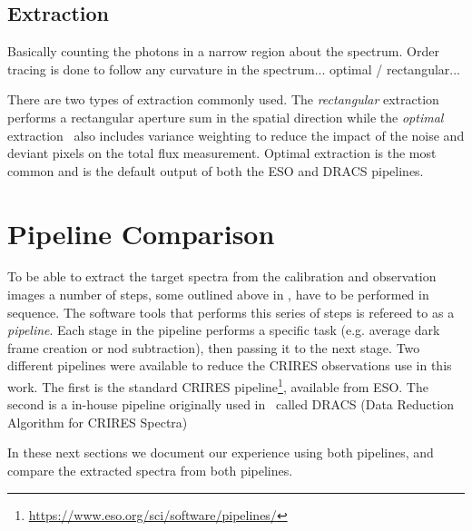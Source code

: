 
\subsection{Extraction}
Basically counting the photons in a narrow region about the spectrum. Order tracing is done to follow any curvature in the spectrum...
optimal / rectangular...

There are two types of extraction commonly used. The \emph{rectangular} extraction performs a rectangular aperture sum in the spatial direction while the \emph{optimal} extraction~\citep{horne_optimal_1986} also includes variance weighting to reduce the impact of the noise and deviant pixels on the total flux measurement. Optimal extraction is the most common and is the default output of both the ESO and DRACS pipelines.


\section{Pipeline Comparison}
To be able to extract the target spectra from the calibration and observation images a number of steps, some outlined above in , have to be performed in sequence. The software tools that performs this series of steps is refereed to as a \emph{pipeline}. Each stage in the pipeline performs a specific task (e.g. average dark frame creation or nod subtraction), then passing it to the next stage. Two different pipelines were available to reduce the CRIRES observations use in this work. The first is the standard CRIRES pipeline\footnote{\href{https://www.eso.org/sci/software/pipelines/}{https://www.eso.org/sci/software/pipelines/}}, available from ESO.
The second is a in-house pipeline originally  used in~\citet{figueira_radial_2010} called DRACS (Data Reduction Algorithm for CRIRES Spectra) 

In these next sections we document our experience using both pipelines, and compare the extracted spectra from both pipelines.



